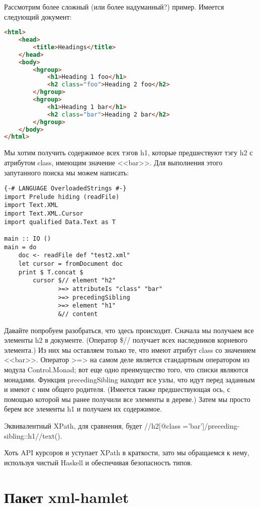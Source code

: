 Рассмотрим более сложный (или более надуманный?) пример. Имеется следующий документ:

\begin{lstlisting}[language=HTML]
<html>
    <head>
        <title>Headings</title>
    </head>
    <body>
        <hgroup>
            <h1>Heading 1 foo</h1>
            <h2 class="foo">Heading 2 foo</h2>
        </hgroup>
        <hgroup>
            <h1>Heading 1 bar</h1>
            <h2 class="bar">Heading 2 bar</h2>
        </hgroup>
    </body>
</html>
\end{lstlisting}

Мы хотим получить содержимое всех тэгов h1, которые предшествуют тэгу h2 с атрибутом class, имеющим значение <<bar>>. Для выполнения этого запутанного поиска мы можем написать:

\begin{lstlisting}
{-# LANGUAGE OverloadedStrings #-}
import Prelude hiding (readFile)
import Text.XML
import Text.XML.Cursor
import qualified Data.Text as T

main :: IO ()
main = do
    doc <- readFile def "test2.xml"
    let cursor = fromDocument doc
    print $ T.concat $
        cursor $// element "h2"
               >=> attributeIs "class" "bar"
               >=> precedingSibling
               >=> element "h1"
               &// content
\end{lstlisting}%

Давайте попробуем разобраться, что здесь происходит. Сначала мы получаем все элементы h2 в документе. (Оператор \$// получает всех наследников корневого элемента.) Из них мы оставляем только те, что имеют атрибут class со значением <<bar>>. Оператор >=> на самом деле является стандартным оператором из модула Control.Monad; вот еще одно преимущество того, что списки являются монадами. Функция precedingSibling находит все узлы, что идут перед заданным и имеют с ним общего родителя. (Имеется также предшествующая ось, с помощью которой мы ранее получили все элементы в дереве.) Затем мы просто берем все элементы h1 и получаем их содержимое.

\begin{remark}
Эквивалентный XPath, для сравнения, будет //h2[@class ='bar']/preceding-sibling::h1//text().
\end{remark}

Хоть API курсоров и уступает XPath в краткости, зато мы обращаемся к нему, используя чистый Haskell и обеспечивая безопасность типов.

\section{Пакет xml-hamlet}

